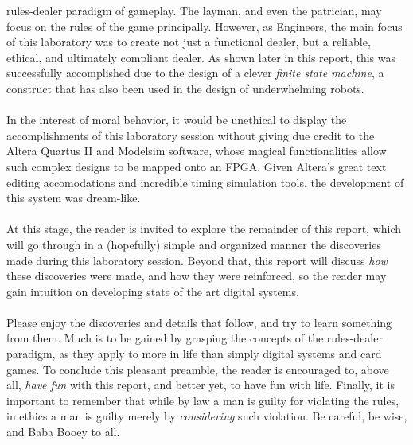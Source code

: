 \documentclass[12pt]{report}
\begin{document}
rules-dealer paradigm of gameplay. The layman, and even the patrician, may focus on the rules of the
game principally. However, as Engineers, the main focus of this laboratory was to create not just a
functional dealer, but a reliable, ethical, and ultimately compliant dealer. As shown later in this
report, this was successfully accomplished due to the design of a clever \textit{finite state
machine}, a construct that has also been used in the design of underwhelming robots.\\\\
In the interest of moral behavior, it would be unethical to display the accomplishments of this
laboratory session without giving due credit to the Altera Quartus II and Modelsim software, whose
magical functionalities allow such complex designs to be mapped onto an FPGA. Given Altera's great
text editing accomodations and incredible timing simulation tools, the development of this system
was dream-like.\\\\
At this stage, the reader is invited to explore the remainder of this report, which will go through
in a (hopefully) simple and organized manner the discoveries made during this laboratory session.
Beyond that, this report will discuss \textit{how} these discoveries were made, and how they were
reinforced, so the reader may gain intuition on developing state of the art digital systems.\\\\
Please enjoy the discoveries and details that follow, and try to learn something from them. Much is
to be gained
by grasping the concepts of the rules-dealer paradigm, as they apply to more in life than simply
digital systems and card games. To conclude this pleasant preamble, the reader is encouraged to,
above all, \textit{have fun} with this report, and better yet, to have fun with life. Finally, it is
important to remember that while by law a man is guilty for violating the rules, in ethics a man is
guilty merely by \textit{considering} such violation. Be careful, be wise, and Baba Booey to all.
\end{document}
